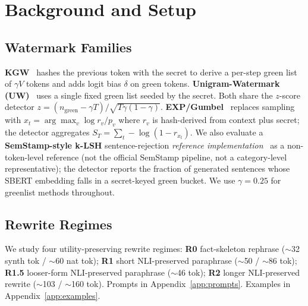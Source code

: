 \documentclass[11pt]{article}
\begin{document}
\section{Background and Setup}
\label{sec:background}

\subsection{Watermark Families}
\textbf{KGW}~\citep{kirchenbauer2023watermark} hashes the previous token
with the secret to derive a per-step green list of $\gamma V$ tokens and
adds logit bias $\delta$ on green tokens.
\textbf{Unigram-Watermark (UW)}~\citep{zhao2024provable} uses a single
fixed green list seeded by the secret. Both share the $z$-score detector
$z=(n_{\mathrm{green}}-\gamma T)/\sqrt{T\gamma(1-\gamma)}$.
\textbf{EXP/Gumbel}~\citep{aaronson2023watermark,kuditipudi2024robust}
replaces sampling with $x_t = \arg\max_v \log r_v / p_v$ where $r_v$ is
hash-derived from context plus secret; the detector aggregates
$S_T = \sum_t -\log(1-r_{x_t})$. We also evaluate a
\textbf{SemStamp-style k-LSH} sentence-rejection
\emph{reference implementation}~\citep{hou2024semstamp} as a non-token-level
reference (not the official SemStamp pipeline, not a category-level
representative); the detector reports the fraction of generated sentences whose SBERT
embedding falls in a secret-keyed green bucket. We use $\gamma=0.25$ for
greenlist methods throughout.

\subsection{Rewrite Regimes}
We study four utility-preserving rewrite regimes:
\textbf{R0} fact-skeleton rephrase ($\sim$32 synth tok / $\sim$60 nat tok);
\textbf{R1} short NLI-preserved paraphrase ($\sim$50 / $\sim$86 tok);
\textbf{R1.5} looser-form NLI-preserved paraphrase ($\sim$46 tok);
\textbf{R2} longer NLI-preserved rewrite ($\sim$103 / $\sim$160 tok).
Prompts in Appendix~\ref{app:prompts}. Examples in Appendix~\ref{app:examples}.
\end{document}
